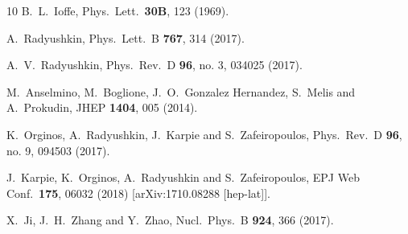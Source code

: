 \begin{thebibliography}{10}
  B.~L.~Ioffe,
  Phys.\ Lett.\  {\bf 30B}, 123 (1969).


  A.~Radyushkin,
  Phys.\ Lett.\ B {\bf 767}, 314 (2017).


  A.~V.~Radyushkin,
  Phys.\ Rev.\ D {\bf 96}, no. 3, 034025 (2017).


  M.~Anselmino, M.~Boglione, J.~O.~Gonzalez Hernandez, S.~Melis and A.~Prokudin,
  JHEP {\bf 1404}, 005 (2014).


  K.~Orginos, A.~Radyushkin, J.~Karpie and S.~Zafeiropoulos,
  Phys.\ Rev.\ D {\bf 96}, no. 9, 094503 (2017).


  J.~Karpie, K.~Orginos, A.~Radyushkin and S.~Zafeiropoulos,
  EPJ Web Conf.\  {\bf 175}, 06032 (2018)
  [arXiv:1710.08288 [hep-lat]].


  X.~Ji, J.~H.~Zhang and Y.~Zhao,
  Nucl.\ Phys.\ B {\bf 924}, 366 (2017).




\end{thebibliography}
